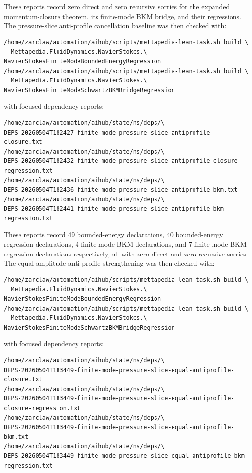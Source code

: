 \documentclass[11pt]{article}
\begin{document}
These reports record zero direct and zero recursive sorries for the expanded
momentum-closure theorem, its finite-mode BKM bridge, and their regressions.
The pressure-slice anti-profile cancellation baseline was then checked with:
\begin{verbatim}
/home/zarclaw/automation/aihub/scripts/mettapedia-lean-task.sh build \
  Mettapedia.FluidDynamics.NavierStokes.\
NavierStokesFiniteModeBoundedEnergyRegression
/home/zarclaw/automation/aihub/scripts/mettapedia-lean-task.sh build \
  Mettapedia.FluidDynamics.NavierStokes.\
NavierStokesFiniteModeSchwartzBKMBridgeRegression
\end{verbatim}
with focused dependency reports:
\begin{verbatim}
/home/zarclaw/automation/aihub/state/ns/deps/\
DEPS-20260504T182427-finite-mode-pressure-slice-antiprofile-closure.txt
/home/zarclaw/automation/aihub/state/ns/deps/\
DEPS-20260504T182432-finite-mode-pressure-slice-antiprofile-closure-regression.txt
/home/zarclaw/automation/aihub/state/ns/deps/\
DEPS-20260504T182436-finite-mode-pressure-slice-antiprofile-bkm.txt
/home/zarclaw/automation/aihub/state/ns/deps/\
DEPS-20260504T182441-finite-mode-pressure-slice-antiprofile-bkm-regression.txt
\end{verbatim}
These reports record 49 bounded-energy declarations, 40 bounded-energy
regression declarations, 4 finite-mode BKM declarations, and 7 finite-mode BKM
regression declarations respectively, all with zero direct and zero recursive
sorries.
The equal-amplitude anti-profile strengthening was then checked with:
\begin{verbatim}
/home/zarclaw/automation/aihub/scripts/mettapedia-lean-task.sh build \
  Mettapedia.FluidDynamics.NavierStokes.\
NavierStokesFiniteModeBoundedEnergyRegression
/home/zarclaw/automation/aihub/scripts/mettapedia-lean-task.sh build \
  Mettapedia.FluidDynamics.NavierStokes.\
NavierStokesFiniteModeSchwartzBKMBridgeRegression
\end{verbatim}
with focused dependency reports:
\begin{verbatim}
/home/zarclaw/automation/aihub/state/ns/deps/\
DEPS-20260504T183449-finite-mode-pressure-slice-equal-antiprofile-closure.txt
/home/zarclaw/automation/aihub/state/ns/deps/\
DEPS-20260504T183449-finite-mode-pressure-slice-equal-antiprofile-closure-regression.txt
/home/zarclaw/automation/aihub/state/ns/deps/\
DEPS-20260504T183449-finite-mode-pressure-slice-equal-antiprofile-bkm.txt
/home/zarclaw/automation/aihub/state/ns/deps/\
DEPS-20260504T183449-finite-mode-pressure-slice-equal-antiprofile-bkm-regression.txt
\end{verbatim}
\end{document}
